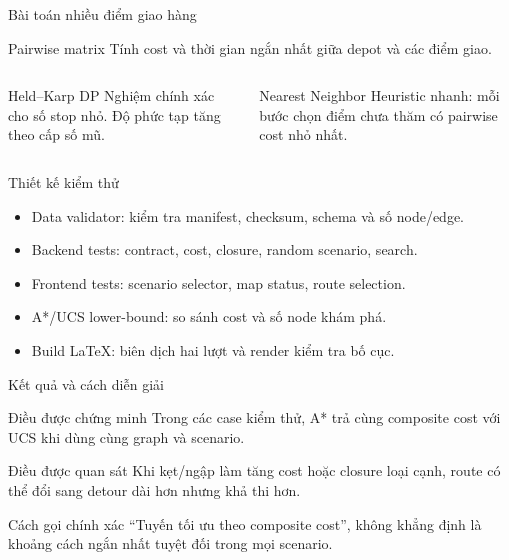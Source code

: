 \documentclass[aspectratio=169,11pt]{beamer}
\begin{document}
\begin{frame}{Bài toán nhiều điểm giao hàng}
\begin{block}{Pairwise matrix}
Tính cost và thời gian ngắn nhất giữa depot và các điểm giao.
\end{block}
\begin{columns}[T]
\begin{block}{Held--Karp DP}
Nghiệm chính xác cho số stop nhỏ. Độ phức tạp tăng theo cấp số mũ.
\end{block}
\begin{block}{Nearest Neighbor}
Heuristic nhanh: mỗi bước chọn điểm chưa thăm có pairwise cost nhỏ nhất.
\end{block}
\end{columns}
\end{frame}

\begin{frame}{Thiết kế kiểm thử}
\begin{itemize}
  \item Data validator: kiểm tra manifest, checksum, schema và số node/edge.
  \item Backend tests: contract, cost, closure, random scenario, search.
  \item Frontend tests: scenario selector, map status, route selection.
  \item A*/UCS lower-bound: so sánh cost và số node khám phá.
  \item Build LaTeX: biên dịch hai lượt và render kiểm tra bố cục.
\end{itemize}
\end{frame}

\begin{frame}{Kết quả và cách diễn giải}
\begin{block}{Điều được chứng minh}
Trong các case kiểm thử, A* trả cùng composite cost với UCS khi dùng cùng graph và scenario.
\end{block}
\begin{block}{Điều được quan sát}
Khi kẹt/ngập làm tăng cost hoặc closure loại cạnh, route có thể đổi sang detour dài hơn nhưng khả thi hơn.
\end{block}
\begin{alertblock}{Cách gọi chính xác}
“Tuyến tối ưu theo composite cost”, không khẳng định là khoảng cách ngắn nhất tuyệt đối trong mọi scenario.
\end{alertblock}
\end{frame}
\end{document}
